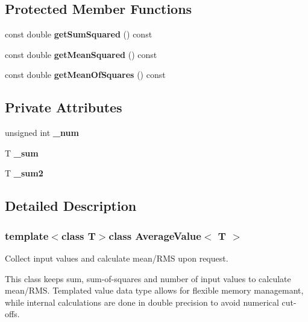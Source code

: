 \subsection*{Protected Member Functions}
\begin{DoxyCompactItemize}
\item 
const double {\bfseries get\-Sum\-Squared} () const \label{classAverageValue_ad6b203c7b59b20a41eeb1583cd13d860}

\item 
const double {\bfseries get\-Mean\-Squared} () const \label{classAverageValue_a2bc4c1917b65d3e0059fdef4cc5483b7}

\item 
const double {\bfseries get\-Mean\-Of\-Squares} () const \label{classAverageValue_a7ebd28e0898ddb72fed239a8ef0aad27}

\end{DoxyCompactItemize}
\subsection*{Private Attributes}
\begin{DoxyCompactItemize}
\item 
unsigned int {\bfseries \-\_\-num}\label{classAverageValue_a889761bd8e0c8677fb24fdd867cc6f36}

\item 
T {\bfseries \-\_\-sum}\label{classAverageValue_a1b42f1de1fbe48182dc99f5a29bc80e7}

\item 
T {\bfseries \-\_\-sum2}\label{classAverageValue_ade9ce93c3c9fbba50e9462e43e5b0e0e}

\end{DoxyCompactItemize}


\subsection{Detailed Description}
\subsubsection*{template$<$class T$>$class Average\-Value$<$ T $>$}

Collect input values and calculate mean/\-R\-M\-S upon request. 

This class keeps sum, sum-\/of-\/squares and number of input values to calculate mean/\-R\-M\-S. Templated value data type allows for flexible memory managemant, while internal calculations are done in double precision to avoid numerical cut-\/offs.

